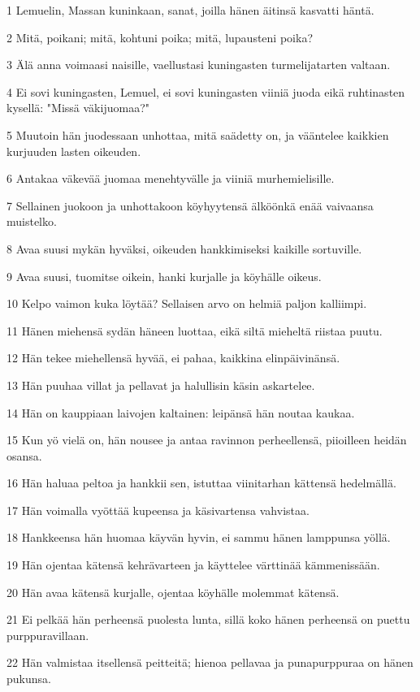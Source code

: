 \par 1 Lemuelin, Massan kuninkaan, sanat, joilla hänen äitinsä kasvatti häntä.
\par 2 Mitä, poikani; mitä, kohtuni poika; mitä, lupausteni poika?
\par 3 Älä anna voimaasi naisille, vaellustasi kuningasten turmelijatarten valtaan.
\par 4 Ei sovi kuningasten, Lemuel, ei sovi kuningasten viiniä juoda eikä ruhtinasten kysellä: "Missä väkijuomaa?"
\par 5 Muutoin hän juodessaan unhottaa, mitä saädetty on, ja vääntelee kaikkien kurjuuden lasten oikeuden.
\par 6 Antakaa väkevää juomaa menehtyvälle ja viiniä murhemielisille.
\par 7 Sellainen juokoon ja unhottakoon köyhyytensä älköönkä enää vaivaansa muistelko.
\par 8 Avaa suusi mykän hyväksi, oikeuden hankkimiseksi kaikille sortuville.
\par 9 Avaa suusi, tuomitse oikein, hanki kurjalle ja köyhälle oikeus.
\par 10 Kelpo vaimon kuka löytää? Sellaisen arvo on helmiä paljon kalliimpi.
\par 11 Hänen miehensä sydän häneen luottaa, eikä siltä mieheltä riistaa puutu.
\par 12 Hän tekee miehellensä hyvää, ei pahaa, kaikkina elinpäivinänsä.
\par 13 Hän puuhaa villat ja pellavat ja halullisin käsin askartelee.
\par 14 Hän on kauppiaan laivojen kaltainen: leipänsä hän noutaa kaukaa.
\par 15 Kun yö vielä on, hän nousee ja antaa ravinnon perheellensä, piioilleen heidän osansa.
\par 16 Hän haluaa peltoa ja hankkii sen, istuttaa viinitarhan kättensä hedelmällä.
\par 17 Hän voimalla vyöttää kupeensa ja käsivartensa vahvistaa.
\par 18 Hankkeensa hän huomaa käyvän hyvin, ei sammu hänen lamppunsa yöllä.
\par 19 Hän ojentaa kätensä kehrävarteen ja käyttelee värttinää kämmenissään.
\par 20 Hän avaa kätensä kurjalle, ojentaa köyhälle molemmat kätensä.
\par 21 Ei pelkää hän perheensä puolesta lunta, sillä koko hänen perheensä on puettu purppuravillaan.
\par 22 Hän valmistaa itsellensä peitteitä; hienoa pellavaa ja punapurppuraa on hänen pukunsa.
